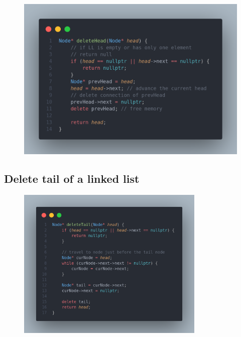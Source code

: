 \documentclass[a4paper, 12pt]{book}
\begin{document}
	\begin{figure}[H]
		\includegraphics[width=\textwidth]{deleteheadcode.png}
		\label{fig:deleteheadcode}
	\end{figure}
	
	\subsection{Delete tail of a linked list}
	\begin{figure}[H]
		\includegraphics[width=0.8\textwidth]{deletetailcode.png}
		\label{fig:deletetailcode}
	\end{figure}
	
\end{document}

